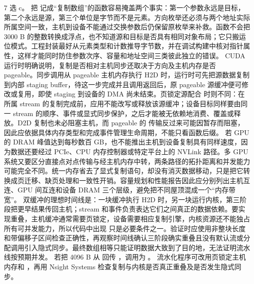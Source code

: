 \begin{solutionexercise}{7}
\conclusionheading 选 c。
\discussionheading
{}
把  记成“复制数组”的函数容易掩盖两个事实：第一个参数永远是目标，第二个永远是源，第三个单位是字节而不是元素。方向枚举还必须与两个地址实际所属空间一致，主机到设备不能通过交换参数后仍保留原枚举来补救。函数不会把 3000 B 的整数转换成浮点，也不知道源和目标是否具有相同对象布局；它只搬运位模式。工程封装最好从元素类型和计数推导字节数，并在调试构建中核对指针属性，这样才能同时防住参数次序、容量和地址空间三类彼此独立的错误。
CUDA 运行时明确说明，复制是否相对主机同步还取决于方向及主机内存是否 pageable。同步调用从 pageable 主机内存执行 H2D 时，运行时可先把源数据复制到内部 staging buffer，待这一步完成并且调用返回后，原 pageable 源缓冲便可修改或复用，即使 staging 到设备的 DMA 尚未结束。页锁定源配合  时则不同：在所属 stream 的复制完成前，应用不能改写或释放该源缓冲；设备目标同样要由同一 stream 的顺序、事件或显式同步保护，之后才能被无依赖地消费、覆盖或释放。D2D 复制也未必阻塞主机，而 pageable 的  传输反过来可能因暂存而阻塞，因此应依据具体内存类型和完成事件管理生命周期，不能只看函数后缀。
若 GPU 的 DRAM 峰值达到每秒数百 GB，也不能推出主机到设备复制具有同样速度，因为数据还要经过 PCIe、CPU 内存控制器或特定平台上的 NVLink 路径。多 GPU 系统又要区分直接点对点传输与经主机内存中转，两条路径的拓扑距离和并发能力可能完全不同。统一内存省去了显式复制语句，却没有消灭数据移动，只是把它转换成页迁移、缺页处理和一致性开销。容量规划和性能报告因此应分别列出主机互连、GPU 间互连和设备 DRAM 三个层级，避免把不同屋顶混成一个“内存带宽”。
双缓冲的理想时间线是：一块缓冲执行 H2D 时，另一块运行内核，第三阶段把更早结果传回主机；stream 和事件负责表达它们之间真正的数据依赖。要实现重叠，主机缓冲通常需要页锁定，设备需要相应复制引擎，内核资源还不能独占所有可并发能力，所以代码中出现  只是必要条件之一。验证时应使用非整块长度和带偏移子区间检查正确性，再观察时间线确认三阶段确实重叠且没有默认流或分配调用引入隐式同步。最终数组相等只能证明数据大致到了目的地，无法证明流水线按预期并发。
\variantheading 若把 4096 B 从  回传 ，调用为 。
\practiceheading 流水化程序可改用页锁定主机内存和 ，再用 Nsight Systems 检查复制与内核是否真正重叠及是否发生隐式同步。
\end{solutionexercise}

